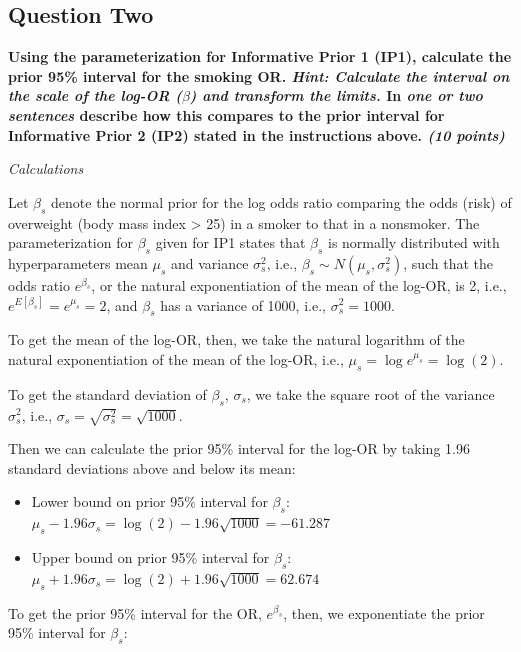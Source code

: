 \documentclass[
  11pt,
]{article}
\begin{document}
\pagebreak

\hypertarget{question-two}{%
\subsection{Question Two}\label{question-two}}

\textbf{Using the parameterization for Informative Prior 1 (IP1), calculate the prior 95\% interval for the smoking OR. \textit{Hint: Calculate the interval on the scale of the log-OR ($\beta$) and transform the limits.} In \textit{one or two sentences} describe how this compares to the prior interval for Informative Prior 2 (IP2) stated in the instructions above. \textit{(10 points)}}

\textit{Calculations}

Let \(\beta_s\) denote the normal prior for the log odds ratio comparing
the odds (risk) of overweight (body mass index \textgreater{} 25) in a
smoker to that in a nonsmoker. The parameterization for \(\beta_s\)
given for IP1 states that \(\beta_s\) is normally distributed with
hyperparameters mean \(\mu_s\) and variance \(\sigma^2_s\), i.e.,
\(\beta_s \sim N(\mu_s, \sigma^2_s)\), such that the odds ratio
\(e^{\beta_s}\), or the natural exponentiation of the mean of the
log-OR, is 2, i.e., \(e^{E[\beta_s]} = e^{\mu_s} = 2\), and \(\beta_s\)
has a variance of 1000, i.e., \(\sigma^2_s = 1000\).

To get the mean of the log-OR, then, we take the natural logarithm of
the natural exponentiation of the mean of the log-OR, i.e.,
\(\mu_s = \log{e^{\mu_{s}}} = \log(2)\).

To get the standard deviation of \(\beta_s\), \(\sigma_s\), we take the
square root of the variance \(\sigma^2_s\), i.e.,
\(\sigma_s = \sqrt{\sigma^2_s} = \sqrt{1000}\).

Then we can calculate the prior 95\% interval for the log-OR by taking
1.96 standard deviations above and below its mean:

\begin{itemize}
\setlength\itemsep{0em}
\item Lower bound on prior 95\% interval for $\beta_s$: $\mu_s - 1.96\sigma_s = \log(2) - 1.96\sqrt{1000} = -61.287$
\item Upper bound on prior 95\% interval for $\beta_s$: $\mu_s + 1.96\sigma_s = \log(2) + 1.96\sqrt{1000} = 62.674$
\end{itemize}

To get the prior 95\% interval for the OR, \(e^{\beta_s}\), then, we
exponentiate the prior 95\% interval for \(\beta_s\):
\end{document}

